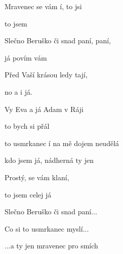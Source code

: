 

\zs
     Mravenec se vám í, to jsi 

    to jsem 

    Slečno Beruško či snad paní, paní,

    já povím vám
\ks

\zs
    Před Vaší krásou ledy tají,

    no a i já.

    Vy Eva a já Adam v Ráji

    to bych si přál
\ks

\zr
     to usmrkanec í  na mě dojem neudělá

     kdo jsem já,  nádherná  ty jen 
\kr

\zs
    Prostý, se vám klaní,

    to jsem celej já

    Slečno Beruško či snad paní...
\ks

\zr
    Co si to usmrkanec myslí...

    ...a ty jen mravenec pro smích
\kr

\kp
